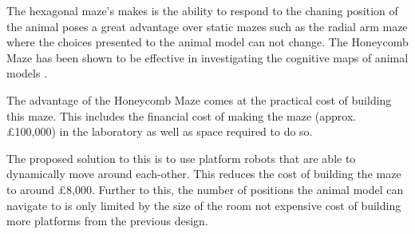 

The hexagonal maze's makes is the ability to respond to the chaning position of the animal poses a great advantage over static mazes such as the radial arm maze where the choices presented to the animal model can not change.
The Honeycomb Maze has been shown to be effective in investigating the cognitive maps of animal models \cite{nature_honeycomb_maze_paper}.

The advantage of the Honeycomb Maze comes at the practical cost of building this maze. This includes the financial cost of making the maze (approx. £100,000) in the laboratory as well as space required to do so.

The proposed solution to this is to use platform robots that are able to dynamically move around each-other. This reduces the cost of building the maze to around £8,000. Further to this, the number of positions the animal model can navigate to is only limited by the size of the room not expensive cost of building more platforms from the previous design.



